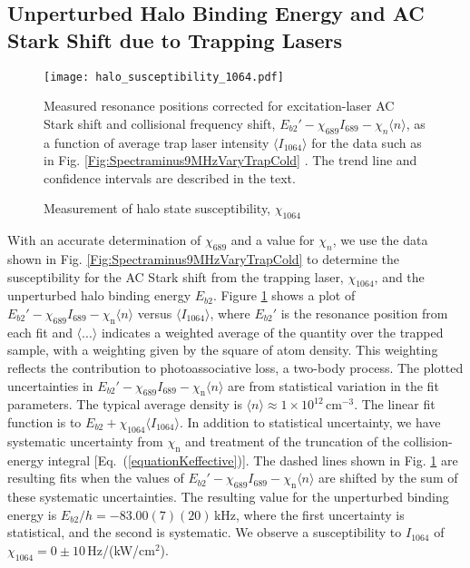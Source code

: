 \subsection{Unperturbed Halo Binding Energy and AC Stark Shift due to Trapping Lasers}

\begin{figure} \label{Fig:ShiftWithTrapIntensity}
 \centerline{
 \texttt{[image: halo\_susceptibility\_1064.pdf]}}
  \caption{Measurement of halo state susceptibility, $\chi_{1064}$}{Measured resonance positions corrected for excitation-laser AC Stark shift and collisional frequency shift, $E_{b2}'-\chi_{689} I_{689} - \chi_{n}\langle n\rangle$, as a function of average trap laser intensity $\langle I_{1064} \rangle$ for the data such as in Fig. \ref{Fig:Spectraminus9MHzVaryTrapCold} . The trend line and confidence intervals are described in the text.}
\end{figure}

With an accurate determination of $\chi_{689}$ and a value for $\chi_n$, we use the data shown in Fig. \ref{Fig:Spectraminus9MHzVaryTrapCold} to determine the susceptibility for the AC Stark shift from the trapping laser, $\chi_{1064}$, and the unperturbed halo binding energy $E_{b2}$. Figure \ref{Fig:ShiftWithTrapIntensity} shows a plot of $E_{b2}'-\chi_{689}I_{689} - \chi_{\text{n}}\langle n\rangle$ versus $\langle I_{1064} \rangle $, where $E_{b2}'$ is the resonance position from each fit and $\langle ... \rangle $ indicates a weighted average of the quantity over the trapped sample, with a weighting given by the square of atom density. This weighting reflects the contribution to photoassociative loss, a two-body process. The plotted uncertainties in $E_{b2}'-\chi_{689}I_{689} - \chi_{\text{n}}\langle n\rangle$ are from statistical variation in the fit parameters. The typical average density is $\langle n\rangle\approx 1\times 10^{12}$\,cm$^{-3}$. The linear fit function is to $E_{b2}+\chi_{1064}\langle I_{1064} \rangle $. In addition to statistical uncertainty, we have systematic uncertainty from $\chi_{\text{n}}$ and treatment of the truncation of the collision-energy integral [Eq.\ (\ref{equationKeffective})]. The dashed lines shown in Fig. \ref{Fig:ShiftWithTrapIntensity} are resulting fits when the values of $E_{b2}'-\chi_{689}I_{689} - \chi_{\text{n}}\langle n\rangle$ are shifted by the sum of these systematic uncertainties. The resulting value for the unperturbed binding energy is $E_{b2}/h=-83.00(7)(20)$\,kHz, where the first uncertainty is statistical, and the second is systematic. We observe a susceptibility to $I_{1064}$ of $\chi_{1064}=0\pm 10$\,Hz/(kW/cm$^2$).


